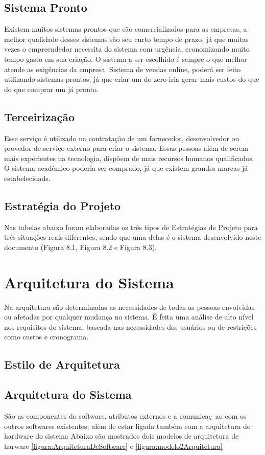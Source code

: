 \subsection{Sistema Pronto}
Existem muitos sistemas prontos que são comercializados para as empresas, a melhor qualidade desses sistemas são seu curto tempo de prazo, já que muitas vezes o empreendedor necessita do sistema com urgência, economizando muito tempo gasto em sua criação. O sistema a ser escolhido é sempre o que melhor atende as exigências da empresa.
Sistema de vendas online, poderá ser feito utilizando sistemas prontos, já que criar um do zero iria gerar mais custos do que do que comprar um já pronto.
\subsection{Terceirização}
 Esse serviço é utilizado na contratação de um fornecedor, desenvolvedor ou provedor de serviço externo para criar o sistema. Essas pessoas além de serem mais experientes na tecnologia, dispõem de mais recursos humanos qualificados.
 O sistema acadêmico poderia ser comprado, já que existem grandes marcas já estabelecidads.
\subsection{Estratégia do Projeto}
 Nas tabelas abaixo foram elaboradas os três tipos de Estratégias de Projeto para três situações reais diferentes, sendo que uma delas é o sistema desenvolvido neste documento (Figura 8.1, Figura 8.2 e Figura 8.3).
 
\section{Arquitetura do Sistema}
Na arquitetura são determinadas as necessidades de todas as pessoas envolvidas ou afetadas por qualquer mudança no sistema. É feita uma análise de alto nível nos requisitos do sistema, baseada nas necessidades dos usuários ou de restrições como custos e cronograma.

\subsection{Estilo de Arquitetura}
  \subsection{Arquitetura do Sistema}
  
 
  São as componentes do software, atributos externos e a comunicaç~ao com os outros softwares existentes, além de estar ligada também com a 
  arquitetura de hardware do sistema
  Abaixo são mostrados dois modelos de arquitetura de harware \ref{figura:ArquiteturaDeSoftware} e \ref{figura:modelo2Arquitetura}
  
